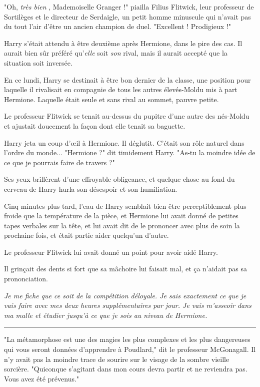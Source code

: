 "Oh, \emph{très bien} , Mademoiselle Granger !" piailla Filius Flitwick, leur professeur de Sortilèges et le directeur de Serdaigle, un petit homme minuscule qui n'avait pas du tout l'air d'être un ancien champion de duel. "Excellent ! Prodigieux !"

Harry s'était attendu à être deuxième après Hermione, dans le pire des cas. Il aurait bien sûr préféré qu'\emph{elle}  soit \emph{son}  rival, mais il aurait accepté que la situation soit inversée.

En ce lundi, Harry se destinait à être bon dernier de la classe, une position pour laquelle il rivalisait en compagnie de tous les autres élevés-Moldu mis à part Hermione. Laquelle était seule et sans rival au sommet, pauvre petite.

Le professeur Flitwick se tenait au-dessus du pupitre d'une autre des nés-Moldu et ajustait doucement la façon dont elle tenait sa baguette.

Harry jeta un coup d'œil à Hermione. Il déglutit. C'était son rôle naturel dans l'ordre du monde... "Hermione ?" dit timidement Harry. "As-tu la moindre idée de ce que je pourrais faire de travers ?"

Ses yeux brillèrent d'une effroyable obligeance, et quelque chose au fond du cerveau de Harry hurla son désespoir et son humiliation.

Cinq minutes plus tard, l'eau de Harry semblait bien être perceptiblement plus froide que la température de la pièce, et Hermione lui avait donné de petites tapes verbales sur la tête, et lui avait dit de le prononcer avec plus de soin la prochaine fois, et était partie aider quelqu'un d'autre.

Le professeur Flitwick lui avait donné un point pour avoir aidé Harry.

Il grinçait des dents si fort que sa mâchoire lui faisait mal, et ça n'aidait pas sa prononciation.

\emph{Je me fiche que ce soit de la compétition déloyale. Je sais exactement ce que je vais faire avec mes deux heures supplémentaires par jour. Je vais m'asseoir dans ma malle et étudier jusqu'à ce que je sois au niveau de Hermione.} 
\par\noindent\rule{\textwidth}{0.4pt}
"La métamorphose est une des magies les plus complexes et les plus dangereuses qui vous seront données d'apprendre à Poudlard," dit le professeur McGonagall. Il n'y avait pas la moindre trace de sourire sur le visage de la sombre vieille sorcière. "Quiconque s'agitant dans mon cours devra partir et ne reviendra pas. Vous avez été prévenus."

